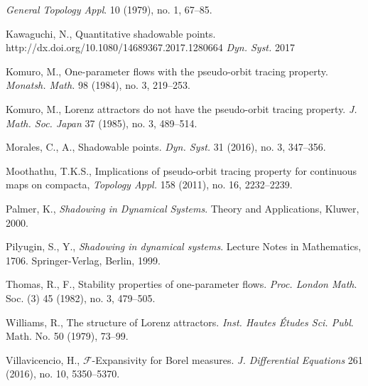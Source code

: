 \documentclass{amsart}
\theoremstyle{definition}
\begin{document}
\begin{thebibliography}{99}
{\em  General Topology Appl}. 10 (1979), no. 1, 67--85.


Kawaguchi, N., Quantitative shadowable points.
http://dx.doi.org/10.1080/14689367.2017.1280664 {\em Dyn. Syst.} 2017


   
 Komuro, M.,  One-parameter flows with the pseudo-orbit tracing property. {\em Monatsh. Math.} 98 (1984), no. 3, 219--253. 

 Komuro, M., Lorenz attractors do not have the pseudo-orbit tracing property. {\em J. Math. Soc. Japan } 37 (1985), no. 3, 489--514. 

 Morales, C., A., Shadowable points. {\em Dyn. Syst.} 31 (2016), no. 3, 347--356. 

 	Moothathu, T.K.S.,
 	Implications of pseudo-orbit tracing property for continuous maps on compacta,
 	{\em Topology Appl.} 158 (2011), no. 16, 2232--2239.

 Palmer, K., {\em Shadowing in Dynamical Systems}. Theory and Applications, Kluwer, 2000. 

 Pilyugin, S., Y., {\em Shadowing in dynamical systems}. Lecture Notes in Mathematics, 1706. Springer-Verlag, Berlin, 1999.
 
 Thomas, R., F.,  Stability properties of one-parameter flows.
{\em Proc. London Math}. Soc. (3) 45 (1982), no. 3, 479--505.





 Williams, R., The structure of Lorenz attractors. {\em Inst. Hautes \'{E}tudes Sci. Publ}. Math. No. 50 (1979), 73--99.

 Villavicencio, H., $\mathcal{F}$-Expansivity for Borel measures.
{\em J. Differential Equations} 261 (2016), no. 10, 5350--5370. 

\end{thebibliography}
\end{document}
